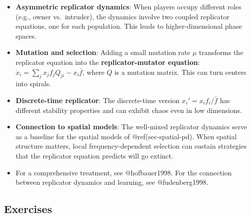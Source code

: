 \documentclass[
]{article}
\providecommand{\tightlist}{%
  \setlength{\itemsep}{0pt}\setlength{\parskip}{0pt}}
\begin{document}
\begin{itemize}
\tightlist
\item
  \textbf{Asymmetric replicator dynamics}: When players occupy different
  roles (e.g., owner vs.~intruder), the dynamics involve two coupled
  replicator equations, one for each population. This leads to
  higher-dimensional phase spaces.
\item
  \textbf{Mutation and selection}: Adding a small mutation rate \(\mu\)
  transforms the replicator equation into the \textbf{replicator-mutator
  equation}: \(\dot{x}_i = \sum_j x_j f_j Q_{ji} - x_i \bar{f}\), where
  \(Q\) is a mutation matrix. This can turn centers into spirals.
\item
  \textbf{Discrete-time replicator}: The discrete-time version
  \(x_i' = x_i f_i / \bar{f}\) has different stability properties and
  can exhibit chaos even in low dimensions.
\item
  \textbf{Connection to spatial models}: The well-mixed replicator
  dynamics serve as a baseline for the spatial models of
  @ref(sec-spatial-pd). When spatial structure matters, local
  frequency-dependent selection can sustain strategies that the
  replicator equation predicts will go extinct.
\item
  For a comprehensive treatment, see @hofbauer1998. For the connection
  between replicator dynamics and learning, see @fudenberg1998.
\end{itemize}

\subsection*{Exercises}\label{exercises}
\end{document}
